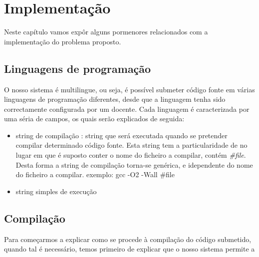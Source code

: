 \chapter{Implementação} \label{chap implem}

Neste capítulo vamos expôr alguns pormenores relacionados com a implementação do problema proposto.

\section{Linguagens de programação}\label{sec lps}
O nosso sistema é multilingue, ou seja, é possível submeter código fonte em várias linguagens de programação diferentes, desde que 
a linguagem tenha sido correctamente configurada por um docente.
Cada linguagem é caracterizada por uma séria de campos, os quais serão explicados de seguida:
\begin{itemize}
\item string de compilação : string que será executada quando se pretender compilar determinado código fonte. Esta string tem a
particularidade de no lugar em que é suposto conter o nome do ficheiro a compilar, contém \textit{#{file}}.\\
Desta forma a string de compilação torna-se genérica, e idependente do nome do ficheiro a compilar.
exemplo: gcc -O2 -Wall #{file}

\item string simples de execução

\end{itemize}


\section{Compilação}\label{sec comp}

Para começarmos a explicar como se procede à compilação do código submetido, quando tal é necessário, temos primeiro de explicar que o
nosso sistema permite a 